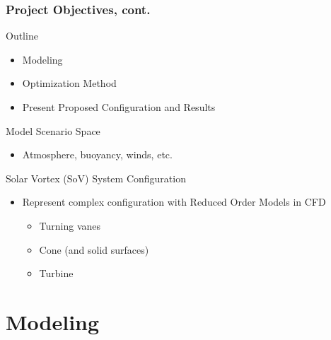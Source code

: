 \documentclass[mathserif]{beamer}
\begin{document}
\begin{frame}
\frametitle{Project Objectives, cont.}


 \begin{block}{Outline}
 \begin{itemize}
  \item Modeling
  \item Optimization Method
  \item Present Proposed Configuration and Results
 \end{itemize}
 \end{block}


 \begin{block}{Model Scenario Space}
  \begin{itemize}
   \item Atmosphere, buoyancy, winds, etc. 
  \end{itemize}
  \end{block}

 \begin{block}{Solar Vortex (SoV) System Configuration}
 \begin{itemize}
  \item Represent complex configuration with Reduced Order Models in CFD
	\begin{itemize}
	 \item Turning vanes
	 \item Cone (and solid surfaces)
	 \item Turbine
	\end{itemize}
 \end{itemize}
 \end{block}


\end{frame}


\section{Modeling}
%
%
\end{document}

